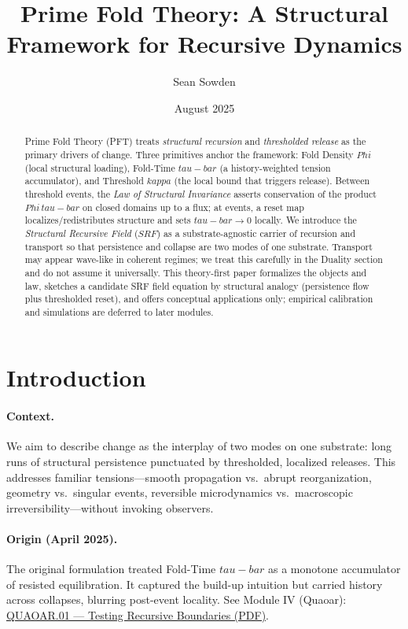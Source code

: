 \documentclass[12pt]{article}
\title{Prime Fold Theory: A Structural Framework for Recursive Dynamics}
\author{Sean Sowden}
\date{August 2025}
\newcommand{\FoldDensity}{\Phi}
\newcommand{\FoldTime}{\bar{\tau}}
\newcommand{\Threshold}{\kappa}
\newcommand{\SRF}{\mathcal{F}_{\mathrm{SR}}}
\def\FoldDensity{Phi}%
\def\FoldTime{tau-bar}%
\def\Threshold{kappa}%
\def\SRF{SRF}%
\def\bar#1{#1}%
\def\mathcal#1{#1}%
\def\mathrm#1{#1}%
\begin{document}
\maketitle

\begin{abstract}
Prime Fold Theory (PFT) treats \emph{structural recursion} and \emph{thresholded release} as the primary drivers of change. Three primitives anchor the framework: Fold Density $\FoldDensity$ (local structural loading), Fold-Time $\FoldTime$ (a history-weighted tension accumulator), and Threshold $\Threshold$ (the local bound that triggers release). Between threshold events, the \emph{Law of Structural Invariance} asserts conservation of the product $\FoldDensity\,\FoldTime$ on closed domains up to a flux; at events, a reset map localizes/redistributes structure and sets $\FoldTime\!\to\!0$ locally. We introduce the \emph{Structural Recursive Field} ($\SRF$) as a substrate-agnostic carrier of recursion and transport so that persistence and collapse are two modes of one substrate. Transport may appear wave-like in coherent regimes; we treat this carefully in the Duality section and do not assume it universally. This theory-first paper formalizes the objects and law, sketches a candidate SRF field equation by structural analogy (persistence flow plus thresholded reset), and offers conceptual applications only; empirical calibration and simulations are deferred to later modules.
\end{abstract}

\tableofcontents

\section{Introduction}

\paragraph{Context.}
We aim to describe change as the interplay of two modes on one substrate: long runs of structural persistence punctuated by thresholded, localized releases. This addresses familiar tensions—smooth propagation vs.\ abrupt reorganization, geometry vs.\ singular events, reversible microdynamics vs.\ macroscopic irreversibility—without invoking observers.

\paragraph{Origin (April 2025).}
The original formulation treated Fold-Time $\FoldTime$ as a monotone accumulator of resisted equilibration. It captured the build-up intuition but carried history across collapses, blurring post-event locality. See Module IV (Quaoar): \href{https://primefoldtheory.org/paper/quaoar_fold_complete_with_figures.pdf}{QUAOAR.01 — Testing Recursive Boundaries (PDF)}.
\end{document}
